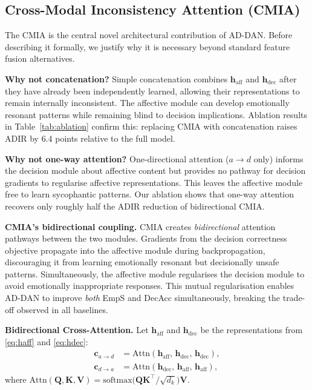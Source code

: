 \documentclass[lettersize,journal]{IEEEtran}
\begin{document}
\subsection{Cross-Modal Inconsistency Attention (CMIA)}

The CMIA is the central novel architectural contribution of AD-DAN.  Before
describing it formally, we justify why it is necessary beyond standard
feature fusion alternatives.

\textbf{Why not concatenation?}  Simple concatenation combines
$\mathbf{h}_\mathrm{aff}$ and $\mathbf{h}_\mathrm{dec}$ after they have
already been independently learned, allowing their representations to remain
internally inconsistent.  The affective module can develop emotionally
resonant patterns while remaining blind to decision implications.
Ablation results in Table~\ref{tab:ablation} confirm this: replacing CMIA
with concatenation raises ADIR by 6.4 points relative to the full model.

\textbf{Why not one-way attention?}  One-directional attention ($a\!\to\!d$
only) informs the decision module about affective content but provides no
pathway for decision gradients to regularise affective representations.
This leaves the affective module free to learn sycophantic patterns.
Our ablation shows that one-way attention recovers only roughly half the
ADIR reduction of bidirectional CMIA.

\textbf{CMIA's bidirectional coupling.}  CMIA creates \emph{bidirectional}
attention pathways between the two modules.  Gradients from the decision
correctness objective propagate into the affective module during
backpropagation, discouraging it from learning emotionally resonant but
decisionally unsafe patterns.  Simultaneously, the affective module
regularises the decision module to avoid emotionally inappropriate responses.
This mutual regularisation enables AD-DAN to improve \emph{both} EmpS and
DecAcc simultaneously, breaking the trade-off observed in all baselines.

\textbf{Bidirectional Cross-Attention.}
Let $\mathbf{h}_\mathrm{aff}$ and $\mathbf{h}_\mathrm{dec}$ be the
representations from \eqref{eq:haff} and \eqref{eq:hdec}:
\begin{align}
\mathbf{c}_{a\to d}
  &= \mathrm{Attn}(\mathbf{h}_\mathrm{aff},\,
                   \mathbf{h}_\mathrm{dec},\,
                   \mathbf{h}_\mathrm{dec}),
\label{eq:cmia1}\\
\mathbf{c}_{d\to a}
  &= \mathrm{Attn}(\mathbf{h}_\mathrm{dec},\,
                   \mathbf{h}_\mathrm{aff},\,
                   \mathbf{h}_\mathrm{aff}),
\label{eq:cmia2}
\end{align}
where
$\mathrm{Attn}(\mathbf{Q},\mathbf{K},\mathbf{V})
 = \mathrm{softmax}\!\bigl(\mathbf{Q}\mathbf{K}^\top/\sqrt{d_k}\bigr)\mathbf{V}$.
\end{document}
